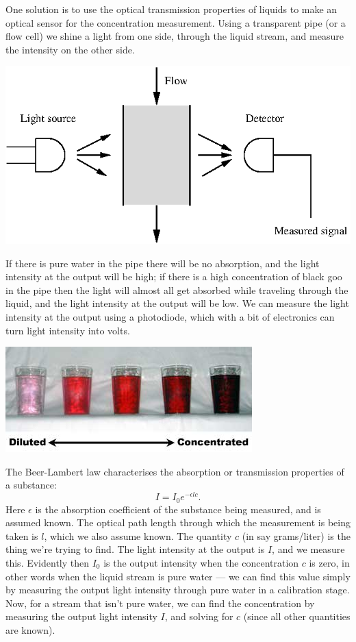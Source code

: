 \documentclass[10pt]{beamer}
\begin{document}
One solution is to use the optical transmission properties of liquids to make an optical sensor for the concentration measurement.  Using a transparent pipe (or a flow cell) we shine a light from one side, through the liquid stream, and measure the intensity on the other side.
\begin{center}
  \includegraphics{beerlambertcell}
\end{center}
If there is pure water in the pipe there will be no absorption, and the light intensity at the output will be high; if there is a high concentration of black goo in the pipe then the light will almost all get absorbed while traveling through the liquid, and the light intensity at the output will be low.  We can measure the light intensity at the output using a photodiode, which with a bit of electronics can turn light intensity into volts.
\begin{center}
  \includegraphics{Dilution-concentration_simple_example}
\end{center}

The Beer-Lambert law characterises the absorption or transmission properties of a substance:
\begin{equation*}
  I = I_0 e^{-\epsilon l c}.
\end{equation*}
Here $\epsilon$ is the absorption coefficient of the substance being measured, and is assumed known.  The optical path length through which the measurement is being taken is $l$, which we also assume known.  The quantity $c$ (in say grams/liter) is the thing we're trying to find.  The light intensity at the output is $I$, and we measure this.  Evidently then $I_0$ is the output intensity when the concentration $c$ is zero, in other words when the liquid stream is pure water --- we can find this value simply by measuring the output light intensity through pure water in a calibration stage.  Now, for a stream that isn't pure water, we can find the concentration by measuring the output light intensity $I$, and solving for $c$ (since all other quantities are known).
\end{document}
